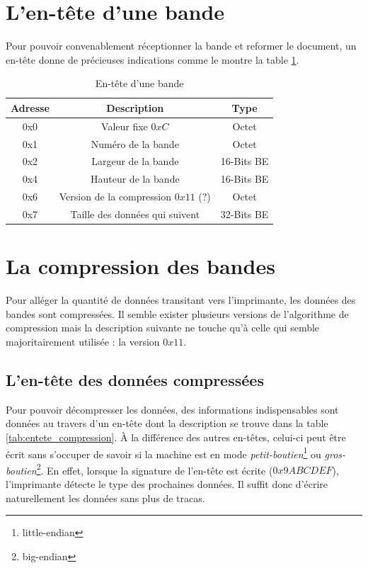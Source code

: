 \section{L'en-tête d'une bande}

Pour pouvoir convenablement réceptionner la bande et reformer le document,
un en-tête donne de précieuses indications comme le montre la table
\ref{tab:entete_bande}.

\begin{table}[!ht]
\centering
\begin{tabular}{| c | c | c |}
\hline
\textbf{Adresse} & \textbf{Description} & \textbf{Type} \\
\hline
\hline
0x0 & Valeur fixe $0xC$ & Octet \\
0x1 & Numéro de la bande & Octet \\
0x2 & Largeur de la bande & 16-Bits BE \\
0x4 & Hauteur de la bande & 16-Bits BE \\
0x6 & Version de la compression $0x11$ (?) & Octet \\
0x7 & Taille des données qui suivent & 32-Bits BE \\
\hline
\end{tabular}
\caption{En-tête d'une bande}
\label{tab:entete_bande}
\end{table}

\section{La compression des bandes}
Pour alléger la quantité de données transitant vers l'imprimante, les
données des bandes sont compressées. Il semble exister plusieurs versions
de l'algorithme de compression mais la description suivante ne touche
qu'à celle qui semble majoritairement utilisée : la version
\textsc{$0x11$}.

\subsection{L'en-tête des données compressées}
Pour pouvoir décompresser les données, des informations indispensables
sont données au travers d'un en-tête dont la description se trouve
dans la table \ref{tab:entete_compression}. À la différence des autres
en-têtes, celui-ci peut être écrit sans s'occuper de savoir si la
machine est en mode \emph{petit-boutien}\footnote{little-endian} ou
\emph{gros-boutien}\footnote{big-endian}. En effet, lorsque la
signature de l'en-tête est écrite ($0x9ABCDEF$), l'imprimante détecte
le type des prochaines données. Il suffit donc d'écrire naturellement
les données sans plus de tracas.

